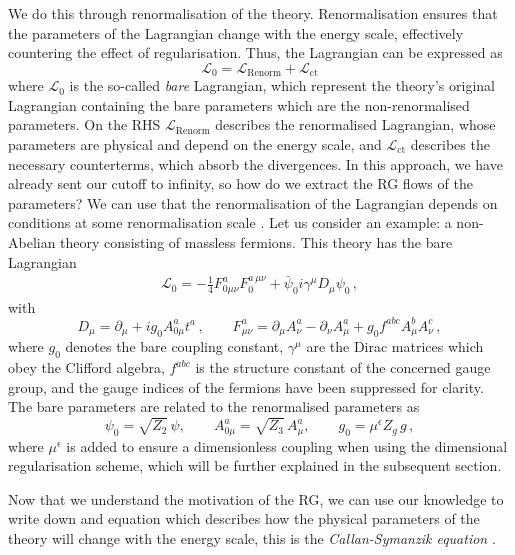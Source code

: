 We do this through renormalisation of the theory. Renormalisation ensures that the parameters of the Lagrangian change with the energy scale, effectively countering the effect of regularisation. Thus, the Lagrangian can be expressed as
\begin{equation}
    \mathcal{L}_{\mathrm{0}}= \mathcal{L}_{\mathrm{Renorm}}+ \mathcal{L}_{\mathrm{ct}}\label{eq:Barelag}
\end{equation} 
where $ \mathcal{L}_{\mathrm{0}}$ is the so-called \textit{bare} Lagrangian, which represent the theory's original Lagrangian containing the bare parameters which are the non-renormalised parameters. On the RHS $\mathcal{L}_{\mathrm{Renorm}}$ describes the renormalised Lagrangian, whose parameters are physical and depend on the energy scale,  and $ \mathcal{L}_{\mathrm{ct}}$ describes the necessary counterterms, which absorb the divergences. In this approach, we have already sent our cutoff to infinity, so how do we extract the RG flows of the parameters? We can use that the renormalisation of the Lagrangian depends on conditions at some renormalisation scale \cite{Peskin:1995ev}. Let us consider an example: a non-Abelian theory consisting of massless fermions. This theory has the bare Lagrangian
\begin{align}
    \mathcal{L}_0 = -\frac{1}{4} F^{a}_{0\mu\nu} F_0^{a\,\mu\nu}
+ \bar{\psi}_0 i \gamma^\mu D_\mu \psi_0\,,\label{eq:LagnonAbelian}
\end{align} 
with
\begin{equation}
D_\mu = \partial_\mu + i g_0 A^a_{0\mu} t^a\,, \qquad F^a_{\mu\nu}=\partial_\mu A_\nu^a-\partial_\nu A^a_\mu+g_0 f^{abc}A_\mu^bA_\nu^c\,,
\end{equation}
where \(g_0\) denotes the bare coupling constant, $\gamma^\mu$ are the Dirac matrices which obey the Clifford algebra, $f^{abc}$ is the structure constant of the concerned gauge group, and the gauge indices of the fermions have been suppressed for clarity. The bare parameters are related to the renormalised parameters as
\begin{equation}
\psi_0 = \sqrt{Z_2}\,\psi, \qquad
A^a_{0\mu} = \sqrt{Z_3}\,A^a_\mu, \qquad
g_0 = \mu^\epsilon Z_g\, g\,, \label{eq:Renormvalue}
\end{equation}
where $\mu^\epsilon$ is added to ensure a dimensionless coupling when using the dimensional regularisation scheme, which will be further explained in the subsequent section.
 
Now that we understand the motivation of the RG, we can use our knowledge to write down and equation which describes how the physical parameters of the theory will change with the energy scale, this is the \textit{Callan-Symanzik equation} \cite{Callan:1970yg,Symanzik:1970rt,Symanzik:1971vw}. 

